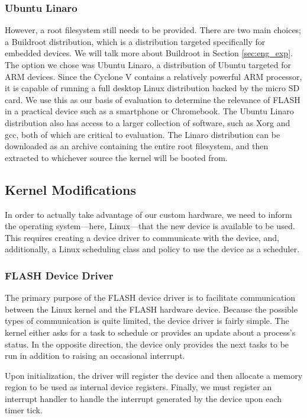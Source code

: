 \documentclass{sig-alternate-10pt}
\begin{document}
\subsubsection{Ubuntu Linaro}
\label{subsubsec:linaro}
However, a root filesystem still needs to be provided. There are two main choices; a Buildroot distribution, which is a distribution targeted specifically for embedded devices. We will talk more about Buildroot in Section \ref{sec:eng_exp}. The option we chose was Ubuntu Linaro, a distribution of Ubuntu targeted for ARM devices. Since the Cyclone V contains a relatively powerful ARM processor, it is capable of running a full desktop Linux distribution backed by the micro SD card. We use this as our basis of evaluation to determine the relevance of FLASH in a practical device such as a smartphone or Chromebook. The Ubuntu Linaro distribution also has access to a larger collection of software, such as Xorg and gcc, both of which are critical to evaluation. The Linaro distribution can be downloaded as an archive containing the entire root filesystem, and then extracted to whichever source the kernel will be booted from.

\subsection{Kernel Modifications}
In order to actually take advantage of our custom hardware, we need to
inform the operating system---here, Linux---that the new device is available
to be used.  This requires creating a device driver to communicate with the
device, and, additionally, a Linux scheduling class and policy to use the
device as a scheduler.

\subsubsection{FLASH Device Driver}
The primary purpose of the FLASH device driver is to facilitate
communication between the Linux kernel and the FLASH hardware device.
Because the possible types of communication is quite limited, the device
driver is fairly simple.  The kernel either asks for a task to schedule or
provides an update about a process's status.  In the opposite direction, the
device only provides the next tasks to be run in addition to raising an
occasional interrupt.

Upon initialization, the driver will register the device and then allocate
a memory region to be used as internal device registers.  Finally, we must
register an interrupt handler to handle the interrupt generated by the
device upon each timer tick.
\end{document}
